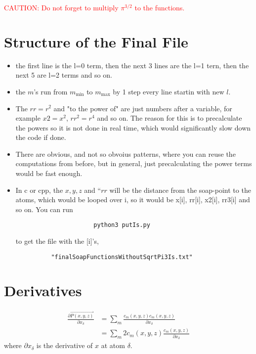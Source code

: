 \documentclass{article}
\begin{document}
\textcolor{red} {CAUTION: Do not forget to multiply $\pi^{3/2}$ to the functions.}


\newpage

\section*{Structure of the Final File}
\begin{itemize}
\item the first line is the l=0 term, then the next 3 lines are the l=1 tern, then the next 5 are l=2 terms and so on.

\item the $m$'s run from $m_\text{min}$ to $m_\text{max}$ by 1 step every line startin with new $l$.

\item The $rr=r^2$ and "to the power of" are just numbers after a variable, for example $x2 = x^2$, $rr^2 = r^4$ and so on. The reason for this is to precalculate the powers so it is not done in real time, which would significantly slow down the code if done.

\item There are obvious, and not so obvoius patterns, where you can reuse the computations from before, but in general, just precalculating the power terms would be fast enough.

\item In c or cpp, the $x,y,z$ and ``$rr$ will be the distance from the soap-point to the atoms, which would be looped over i, so it would be x[i], rr[i], x2[i], rr3[i] and so on. You can run 
\begin{verbatim}
                      python3 putIs.py 
\end{verbatim}
to get the file with the [i]'s,
\begin{verbatim}
          "finalSoapFunctionsWithoutSqrtPi3Is.txt"
\end{verbatim}
\end{itemize}

\section*{Derivatives}

\begin{align}
 \frac{\partial\vec{P(x,y,z)}}{\partial x_\delta} &= \sum_m \frac{c_m(x,y,z)c_m(x,y,z)}{\partial x_\delta} \nonumber \\ 
 &= \sum_m 2c_m(x,y,z) \frac{c_m(x,y,z)}{\partial x_\delta}
\end{align}
where $\partial x_\delta$ is the derivative of $x$ at atom $\delta$. 
\end{document}
